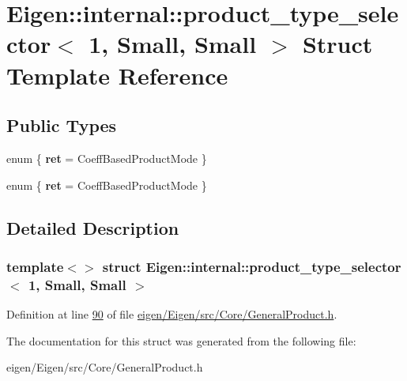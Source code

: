 \hypertarget{struct_eigen_1_1internal_1_1product__type__selector_3_011_00_01_small_00_01_small_01_4}{}\section{Eigen\+:\+:internal\+:\+:product\+\_\+type\+\_\+selector$<$ 1, Small, Small $>$ Struct Template Reference}
\label{struct_eigen_1_1internal_1_1product__type__selector_3_011_00_01_small_00_01_small_01_4}
\subsection*{Public Types}
\begin{DoxyCompactItemize}
\item 
\mbox{\label{struct_eigen_1_1internal_1_1product__type__selector_3_011_00_01_small_00_01_small_01_4_a6dc9393ea911f4c117e5f59217f8e864}} 
enum \{ {\bfseries ret} = Coeff\+Based\+Product\+Mode
 \}
\item 
\mbox{\label{struct_eigen_1_1internal_1_1product__type__selector_3_011_00_01_small_00_01_small_01_4_a2263afd48f7c6422c438fa7f26443aa3}} 
enum \{ {\bfseries ret} = Coeff\+Based\+Product\+Mode
 \}
\end{DoxyCompactItemize}


\subsection{Detailed Description}
\subsubsection*{template$<$$>$\newline
struct Eigen\+::internal\+::product\+\_\+type\+\_\+selector$<$ 1, Small, Small $>$}



Definition at line \hyperlink{eigen_2_eigen_2src_2_core_2_general_product_8h_source_l00090}{90} of file \hyperlink{eigen_2_eigen_2src_2_core_2_general_product_8h_source}{eigen/\+Eigen/src/\+Core/\+General\+Product.\+h}.



The documentation for this struct was generated from the following file\+:\begin{DoxyCompactItemize}
\item 
eigen/\+Eigen/src/\+Core/\+General\+Product.\+h\end{DoxyCompactItemize}
